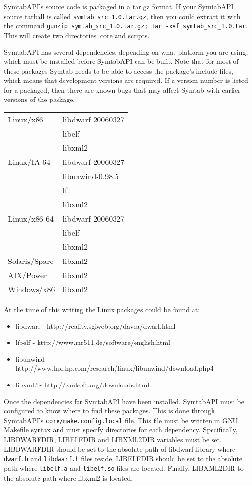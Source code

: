 SymtabAPI's source code is packaged in a tar.gz format. If your SymtabAPI
source tarball is called \texttt{symtab\_src\_1.0.tar.gz}, then you could extract
it with the command \texttt{gunzip symtab\_src\_1.0.tar.gz; tar -xvf
symtab\_src\_1.0.tar}. This will create two directories: core and scripts.  

SymtabAPI has several dependencies, depending on what platform you are using,
which must be installed before SymtabAPI can be built. Note that for most of
these packages Symtab needs to be able to access the package's include files,
which means that development versions are required. If a version number is
listed for a packaged, then there are known bugs that may affect Symtab with
earlier versions of the package. 

\begin{center}
    \begin{tabular}{ll}
Linux/x86       & libdwarf-20060327 \\
                & libelf\\
                & libxml2\\
Linux/IA-64     & libdwarf-20060327 \\
                & libunwind-0.98.5 \\
                & lf \\
                & libxml2 \\
Linux/x86-64    & libdwarf-20060327 \\
                & libelf \\
                & libxml2 \\
Solaris/Sparc   & libxml2 \\
AIX/Power       & libxml2 \\
Windows/x86     & libxml2
\end{tabular}
\end{center}

At the time of this writing the Linux packages could be found at:
\begin{itemize}
    \item libdwarf - http://reality.sgiweb.org/davea/dwarf.html
    \item libelf - http://www.mr511.de/software/english.html
    \item libunwind - http://www.hpl.hp.com/research/linux/libunwind/download.php4
    \item libxml2 - http://xmlsoft.org/downloads.html
\end{itemize}

Once the dependencies for SymtabAPI have been installed, SymtabAPI must be
configured to know where to find these packages. This is done through
SymtabAPI's \texttt{core/make.config.local} file. This file must be written in
GNU Makefile syntax and must specify directories for each dependency.
Specifically, LIBDWARFDIR, LIBELFDIR and LIBXML2DIR variables must be set.
LIBDWARFDIR should be set to the absolute path of libdwarf library where
\texttt{dwarf.h} and \texttt{libdwarf.h} files reside. LIBELFDIR should be set
to the absolute path where \texttt{libelf.a} and \texttt{libelf.so} files are
located. Finally, LIBXML2DIR to the absolute path where libxml2 is located.

